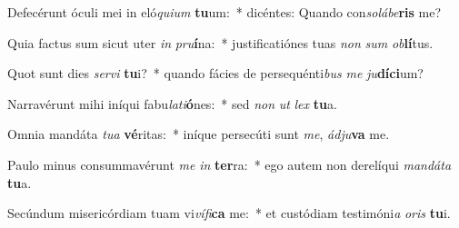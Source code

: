 \item Defecérunt óculi mei in eló\textit{qui}\textit{um} \textbf{tu}um:~* dicéntes: Quando con\textit{so}\textit{lá}\textit{be}\textbf{ris} me?
\item Quia factus sum sicut uter \textit{in} \textit{pru}\textbf{í}na:~* justificatiónes tuas \textit{non} \textit{sum} \textit{ob}\textbf{lí}tus.
\item Quot sunt dies \textit{ser}\textit{vi} \textbf{tu}i?~* quando fácies de persequénti\textit{bus} \textit{me} \textit{ju}\textbf{dí}\textbf{ci}um?
\item Narravérunt mihi iníqui fabu\textit{la}\textit{ti}\textbf{ó}nes:~* sed \textit{non} \textit{ut} \textit{lex} \textbf{tu}a.
\item Omnia mandáta \textit{tu}\textit{a} \textbf{vé}ritas:~* iníque persecúti sunt \textit{me}, \textit{ád}\textit{ju}\textbf{va} me.
\item Paulo minus consummavérunt \textit{me} \textit{in} \textbf{ter}ra:~* ego autem non derelíqui \textit{man}\textit{dá}\textit{ta} \textbf{tu}a.
\item Secúndum misericórdiam tuam vi\textit{ví}\textit{fi}\textbf{ca} me:~* et custódiam testimóni\textit{a} \textit{o}\textit{ris} \textbf{tu}i.
